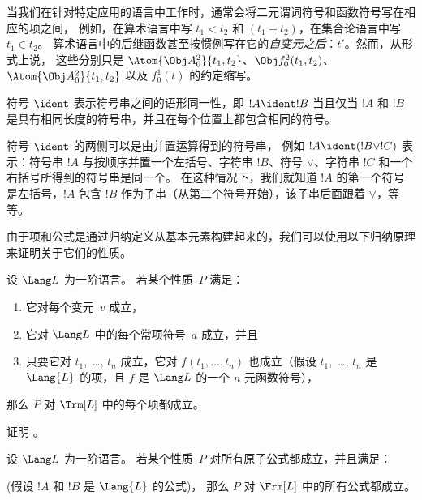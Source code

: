 \documentclass[../../../include/open-logic-section]{subfiles}
\begin{document}
当我们在针对特定应用的语言中工作时，通常会将二元谓词符号和函数符号写在相应的项之间，
例如，在算术语言中写 $t_1 < t_2$ 和 $(t_1 + t_2)$，在集合论语言中写 $t_1 \in t_2$。
算术语言中的后继函数甚至按惯例写在它的\emph{自变元之后}：$t'$。然而，从形式上说，
这些分别只是 $\Atom{\Obj A^2_0}{t_1, t_2}$、$\Obj f^2_0(t_1, t_2)$、$\Atom{\Obj A^2_0}{t_1, t_2}$ 以及 $f^1_0(t)$ 的约定缩写。

\begin{defn}[语形同一性]
符号 $\ident$ 表示符号串之间的语形同一性，即 $!A \ident !B$ 当且仅当 $!A$ 和 $!B$ 是具有相同长度的符号串，并且在每个位置上都包含相同的符号。
\end{defn}

符号 $\ident$ 的两侧可以是由并置运算得到的符号串，
例如 $!A \ident (!B \lor !C)$ 表示：符号串 $!A$ 与按顺序并置一个左括号、字符串 $!B$、符号 $\lor$、字符串 $!C$ 和一个右括号所得到的符号串是同一个。
在这种情况下，我们就知道 $!A$ 的第一个符号是左括号，$!A$ 包含 $!B$ 作为子串（从第二个符号开始），该子串后面跟着 $\lor$，等等。

由于项和公式是通过归纳定义从基本元素构建起来的，我们可以使用以下归纳原理来证明关于它们的性质。

\begin{lem}
    设 $\Lang L$ 为一阶语言。
    若某个性质~$P$ 满足：
    \begin{enumerate}
        \item 它对每个变元~$v$ 成立，
        \item 它对 $\Lang L$ 中的每个常项符号~$a$ 成立，并且
        \item 只要它对 $t_1$,~\dots, $t_n$ 成立，它对 $f(t_1,\dotsc,t_n)$ 也成立（假设 $t_1$,~\dots, $t_n$ 是 $\Lang{L}$ 的项，且 $f$ 是 $\Lang L$ 的一个 $n$ 元函数符号），
    \end{enumerate}
    那么 $P$ 对 $\Trm[L]$ 中的每个项都成立。
\end{lem}

\begin{prob}
    证明 。
\end{prob}

\begin{lem}
    设 $\Lang L$ 为一阶语言。
    若某个性质~$P$ 对所有原子公式都成立，并且满足：
    \begin{enumerate}
  \end{enumerate}
  (假设 $!A$ 和 $!B$ 是 $\Lang{L}$ 的公式)，
  那么 $P$ 对 $\Frm[L]$ 中的所有公式都成立。
\end{lem}
\end{document}
